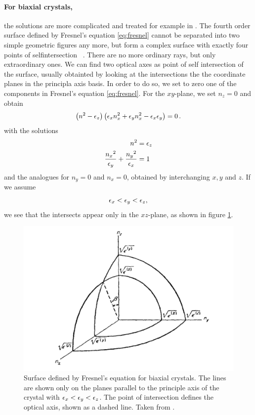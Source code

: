 \paragraph{For biaxial crystals,}
the solutions are more complicated and 
treated for example in \cite{landau1984electrodynamics}. 
The fourth order surface defined by Fresnel's equation 
\eqref{eq:fresnel} cannot be separated into two 
simple geometric figures any more, but form a 
complex surface with exactly four points of selfintersection
~\cite{born1999principles}. 
There are no more ordinary rays, but only 
extraordinary ones. We can find two 
optical axes as point of self intersection of the 
surface, usually obtainted by looking at the intersections 
the the coordinate planes in the principla axis basis.
In order to do so, we set to zero one of the components 
in Fresnel's equation \eqref{eq:fresnel}. For the 
$xy$-plane, we set $n_z = 0$ and obtain
\begin{equation}
    \left(n^2 - \epsilon_z\right) 
    \left(\epsilon_x n_x^2 + 
        \epsilon_y n_x^2  -
        \epsilon_x \epsilon_y 
    \right) = 0 \, .
\end{equation}
with the solutions
\begin{align}
    n^2 &= \epsilon_z 
    \label{eq:sphere} \\
    \frac{{n_x}^2}{ \epsilon_y} + \frac{{n_y}^2}{ \epsilon_x} &= 1
    \label{eq:ellipsoid}
\end{align}
and the analogues for $n_y = 0$ and $n_x = 0$, obtained by 
interchanging $x, y$ and $z$. If we assume 
\begin{equation}
    \epsilon_x < \epsilon_y < \epsilon_z, 
\end{equation}
we see that the intersects appear only in the $xz$-plane, as shown in 
figure \ref{fig:biaxial_ellipsoid}.
\begin{figure}
\includegraphics[width=\pltw]{figures/biaxial_ellipsoid.pdf}
\caption{Surface defined by Fresnel's equation for biaxial crystals.
    The lines are shown only on the planes parallel to the principle 
    axis of the crystal with $\epsilon_x < \epsilon_y < \epsilon_z$.
    The point of intersection defines the optical axis, 
    shown as a dashed line. 
    Taken from \cite{landau1984electrodynamics}. }
\label{fig:biaxial_ellipsoid}
\end{figure}
